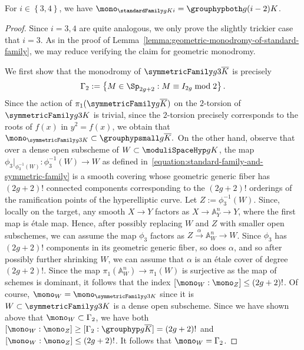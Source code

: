 \begin{proposition}
	\label{proposition:monodromy-of-small-standard-family}
	For $i \in \left\{ 3,4 \right\}$, we have $\mono_{\standardFamily g K i} = \grouphypboth g {(i-2)} K$.
\end{proposition}
\begin{proof}
	Since $i = 3,4$ are quite analogous, we only prove the slightly
	trickier case that $i = 3$.
	As in the proof of
	Lemma~\ref{lemma:geometric-monodromy-of-standard-family},
	we may reduce verifying the claim for geometric monodromy.
	
	We first show that the monodromy of
	$\symmetricFamily g 3 {\overline K}$ is precisely
	\begin{align*}
		\Gamma_2 := \left\{ M \in \Sp_{2g+2} : M \equiv I_{2g} \bmod 2 \right\}.
	\end{align*}			
	Since the action of $\pi_1(\symmetricFamily g {\overline K})$ on the $2$-torsion
	of $\symmetricFamily g 3 K$ is trivial, since the $2$-torsion precisely
	corresponds to the roots of $f(x)$ in $y^2 = f(x)$,
	we obtain that $\mono_{\symmetricFamily g 3 K} \subset \grouphypsmall g {\overline K}.$
	On the other hand,
	observe that over a dense open subscheme of $W \subset \moduliSpaceHyp g K$,
	the map $\phi_3|_{\phi_3^{-1}(W)}: \phi_3^{-1}(W) \rightarrow W$ as defined in~\eqref{equation:standard-family-and-symmetric-family}
	is a smooth covering whose geometric generic fiber has
	$(2g+2)!$ connected components corresponding
	to the $(2g+2)!$ orderings of the ramification points of the hyperelliptic
	curve.
	Let $Z := \phi_3^{-1}(W)$.
	Since, locally on the target, any smooth $X \rightarrow Y$ factors as
	$X \rightarrow \mathbb A^n_Y \rightarrow Y$, where
	the first map is \'etale map.
	Hence, after possibly replacing $W$ and $Z$ with smaller open subschemes,
	we can assume the map $\phi_3$ factors as $Z \xrightarrow \alpha \mathbb A^n_W \rightarrow W$.
	Since $\phi_3$ has $(2g + 2)!$ components in its geometric generic fiber,
	so does $\alpha$, and so after possibly further shrinking $W$,
	we can assume that $\alpha$ is an \'etale cover of degree
	$(2g+2)!$.
	Since the map $\pi_1(\mathbb A^n_W) \rightarrow \pi_1(W)$ is surjective
	as the map of schemes is dominant, it follows that the index
	$[\mono_W : \mono_Z] \leq (2g+2)!$.
	Of course, $\mono_W = \mono_{\symmetricFamily g 3 K}$ since
	it is $W \subset \symmetricFamily g 3 K$ is a dense open subscheme.
	Since we have shown above that $\mono_W \subset \Gamma_2$,
	we have both
	$[\mono_W :\mono_Z] \geq [\Gamma_2 : \grouphyp g {\overline K}] = (2g+2)!$
	and $[\mono_W : \mono_Z] \leq (2g+2)!$.
	It follows that $\mono_W = \Gamma_2$.


\end{proof}
